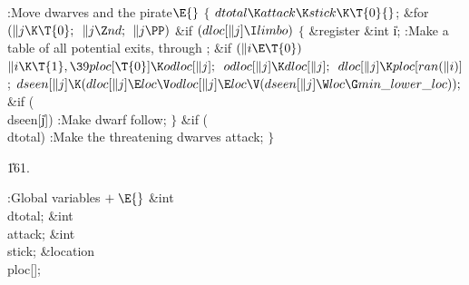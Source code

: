 \Y\B\4:Move dwarves and the pirate\X${}\E{}$\6
${}\{{}$\1\6
${}\\{dtotal}\K\\{attack}\K\\{stick}\K\T{0}{}$;\6
\&{for} ${}(\|j\K\T{0};{}$ ${}\|j\Z\\{nd};{}$ ${}\|j\PP){}$\1\6
\&{if} ${}(\\{dloc}[\|j]\I\\{limbo}){}$\5
${}\{{}$\1\6
\&{register} \&{int} \|i;\7
:Make a table of all potential exits,  through \X;\6
\&{if} ${}(\|i\E\T{0}){}$\1\5
${}\|i\K\T{1},\39\\{ploc}[\T{0}]\K\\{odloc}[\|j];{}$\2\6
${}\\{odloc}[\|j]\K\\{dloc}[\|j];{}$\6
${}\\{dloc}[\|j]\K\\{ploc}[\\{ran}(\|i)]{}$;\6
${}\\{dseen}[\|j]\K(\\{dloc}[\|j]\E\\{loc}\V\\{odloc}[\|j]\E\\{loc}\V(%
\\{dseen}[\|j]\W\\{loc}\G\\{min\_lower\_loc}));{}$\6
\&{if} (\\{dseen}[\|j])\1\5
:Make dwarf  follow\X;\2\6
\4${}\}{}$\2\2\6
\&{if} (\\{dtotal})\1\5
:Make the threatening dwarves attack\X;\2\6
\4${}\}{}$\2\par
\U161.\fi

\B{}:Global variables\X${}\mathrel+\E{}$\6
\&{int} \\{dtotal};\6
\&{int} \\{attack};\6
\&{int} \\{stick};\6
\&{location} \\{ploc}[];\par
\fi

